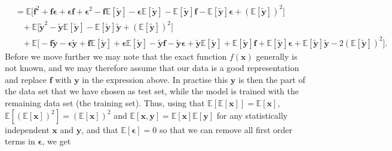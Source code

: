 \documentclass[aps,pra,english,notitlepage,reprint,nofootinbib]{revtex4-1}  %
\begin{document}
\begin{align*}
\\
&= \mathbb{E}\Big[\mathbf{f}^2 + \mathbf{f}\boldsymbol{\epsilon} + \boldsymbol{\epsilon}\mathbf{f} + \boldsymbol{\epsilon}^2 - \mathbf{f}\mathbb{E}\left[\mathbf{\tilde{y}}\right] -\boldsymbol{\epsilon}\mathbb{E}\left[\mathbf{\tilde{y}}\right] -\mathbb{E}\left[\mathbf{\tilde{y}}\right]\mathbf{f} -\mathbb{E}\left[\mathbf{\tilde{y}}\right]\boldsymbol{\epsilon}  + \left(\mathbb{E}\left[\mathbf{\tilde{y}}\right]\right)^2\Big]
\\
&\hspace{10pt} + \mathbb{E}\Big[\mathbf{\tilde{y}}^2 - \mathbf{\tilde{y}}\mathbb{E}\left[\mathbf{\tilde{y}}\right] - \mathbb{E}\left[\mathbf{\tilde{y}}\right]\mathbf{\tilde{y}} + \left(\mathbb{E}\left[\mathbf{\tilde{y}}\right]\right)^2\Big]
\\
&\hspace{10pt} +\mathbb{E}\Big[-\mathbf{f}\mathbf{\tilde{y}}- \boldsymbol{\epsilon}\mathbf{\tilde{y}} + \mathbf{f}\mathbb{E}\left[\mathbf{\tilde{y}} \right]+ \boldsymbol{\epsilon}\mathbb{E}\left[\mathbf{\tilde{y}} \right]  - \mathbf{\tilde{y}}\mathbf{f}- \mathbf{\tilde{y}}\boldsymbol{\epsilon} + \mathbf{\tilde{y}}\mathbb{E}\left[\mathbf{\tilde{y}}\right] + \mathbb{E}\left[\mathbf{\tilde{y}}\right]\mathbf{f}+ \mathbb{E}\left[\mathbf{\tilde{y}}\right]\boldsymbol{\epsilon} + \mathbb{E}\left[\mathbf{\tilde{y}}\right]\mathbf{\tilde{y}} - 2\left(\mathbb{E}\left[\mathbf{\tilde{y}}\right]\right)^2\Big].
\end{align*}
Before we move further we may note that the exact function $f(\mathbf{x})$ generally is not known, and we may therefore assume that our data is a good representation and replace $\mathbf{f}$ with $\mathbf{y}$ in the expression above. In practise this $\mathbf{y}$ is then the part of the data set that we have chosen as test set, while the model is trained with the remaining data set (the training set). Thus, using that $\mathbb{E}[\mathbb{E}[\mathbf{x}]]= \mathbb{E}[\mathbf{x}]$, $\mathbb{E}[(\mathbb{E}[\mathbf{x}])^2] = (\mathbb{E}[\mathbf{x}])^2$ and $\mathbb{E}[\mathbf{x},\mathbf{y}]=\mathbb{E}[\mathbf{x}]\mathbb{E}[\mathbf{y}]$ for any statistically independent $\mathbf{x}$ and $\mathbf{y}$, and that $\mathbb{E}[\boldsymbol{\epsilon}]=0$ so that we can remove all first order terms in $\boldsymbol{\epsilon}$, we get
\end{document}

